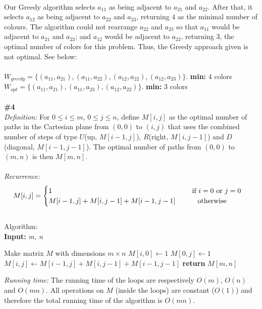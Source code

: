 \documentclass{article}
\newcommand\tab[1][1cm]{\hspace*{#1}}
\begin{document}
\\
Our Greedy algorithm selects $a_{11}$ as being adjacent to $a_{21}$ and $a_{22}$. After that, it selects $a_{12}$ as being adjacent to $a_{22}$ and $a_{23}$, returning $4$ as the minimal number of colours. The algorithm could not rearrange $a_{22}$ and $a_{23}$ so that $a_{11}$ would be adjacent to $a_{21}$ and $a_{23}$; and $a_{12}$ would be adjacent to $a_{22}$, returning $3$, the optimal number of colors for this problem. Thus, the Greedy approach given is not optimal. See below:\\
\\
$W_{greedy} = \{(a_{11}, a_{21}), (a_{11}, a_{22}), (a_{12}, a_{22}), (a_{12}, a_{23})\}$. \textbf{min:} $4$ colors\\
$W_{opt} = \{(a_{11}, a_{21}), (a_{11}, a_{23}), (a_{12}, a_{22})\}$. \textbf{min:} 3 colors\\
\\
\textbf{\#4}\\
\textit{Definition:} For $0 \leq i \leq m$, $0 \leq j \leq n$, define $M[i, j]$ as the optimal number of paths in the Cartesian plane from $(0, 0)$ to $(i, j)$ that uses the combined number of steps of type $U$(up, $M[i-1, j]$), $R$(right, $M[i, j-1]$) and $D$(diagonal, $M[i-1, j-1]$). The optimal number of paths from $(0,0)$ to $(m, n)$ is then $M[m, n]$.\\
\\
\textit{Recurrence:}
\begin{gather*}
M[i, j] =
\begin{cases}
1 \tab\tab\tab\tab\tab\tab\tab $if $i = 0$ or $j = 0 \\
M[i-1, j] + M[i, j-1] + M[i-1, j-1] \tab $ otherwise $
\end{cases}
\end{gather*}\\
Algorithm:\\
\textbf{Input:} \textit{m, n}
\begin{algorithmic}
\State Make matrix $M$ with dimensions $m \times n$
  \State $M[i, 0] \gets 1$
\EndFor
{}
  \State $M[0, j] \gets 1$
\EndFor
{}
    \State $M[i, j] \gets M[i-1, j] + M[i, j-1] + M[i-1, j-1]$
  \EndFor
\EndFor
\State \textbf{return} $M[m, n]$\\
\end{algorithmic}
\textit{Running time:} The running time of the loops are respectively $O(m)$, $O(n)$ and $O(mn)$. All operations on $M$ (inside the loops) are constant ($O(1)$) and therefore the total running time of the algorithm is $O(mn)$.\\\\
\end{document}
